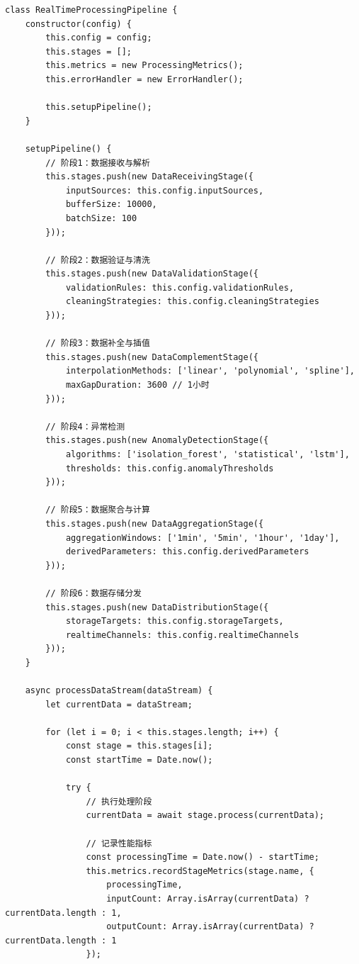 \begin{lstlisting}
class RealTimeProcessingPipeline {
    constructor(config) {
        this.config = config;
        this.stages = [];
        this.metrics = new ProcessingMetrics();
        this.errorHandler = new ErrorHandler();
        
        this.setupPipeline();
    }
    
    setupPipeline() {
        // 阶段1：数据接收与解析
        this.stages.push(new DataReceivingStage({
            inputSources: this.config.inputSources,
            bufferSize: 10000,
            batchSize: 100
        }));
        
        // 阶段2：数据验证与清洗
        this.stages.push(new DataValidationStage({
            validationRules: this.config.validationRules,
            cleaningStrategies: this.config.cleaningStrategies
        }));
        
        // 阶段3：数据补全与插值
        this.stages.push(new DataComplementStage({
            interpolationMethods: ['linear', 'polynomial', 'spline'],
            maxGapDuration: 3600 // 1小时
        }));
        
        // 阶段4：异常检测
        this.stages.push(new AnomalyDetectionStage({
            algorithms: ['isolation_forest', 'statistical', 'lstm'],
            thresholds: this.config.anomalyThresholds
        }));
        
        // 阶段5：数据聚合与计算
        this.stages.push(new DataAggregationStage({
            aggregationWindows: ['1min', '5min', '1hour', '1day'],
            derivedParameters: this.config.derivedParameters
        }));
        
        // 阶段6：数据存储分发
        this.stages.push(new DataDistributionStage({
            storageTargets: this.config.storageTargets,
            realtimeChannels: this.config.realtimeChannels
        }));
    }
    
    async processDataStream(dataStream) {
        let currentData = dataStream;
        
        for (let i = 0; i < this.stages.length; i++) {
            const stage = this.stages[i];
            const startTime = Date.now();
            
            try {
                // 执行处理阶段
                currentData = await stage.process(currentData);
                
                // 记录性能指标
                const processingTime = Date.now() - startTime;
                this.metrics.recordStageMetrics(stage.name, {
                    processingTime,
                    inputCount: Array.isArray(currentData) ? currentData.length : 1,
                    outputCount: Array.isArray(currentData) ? currentData.length : 1
                });
                

\end{lstlisting}
